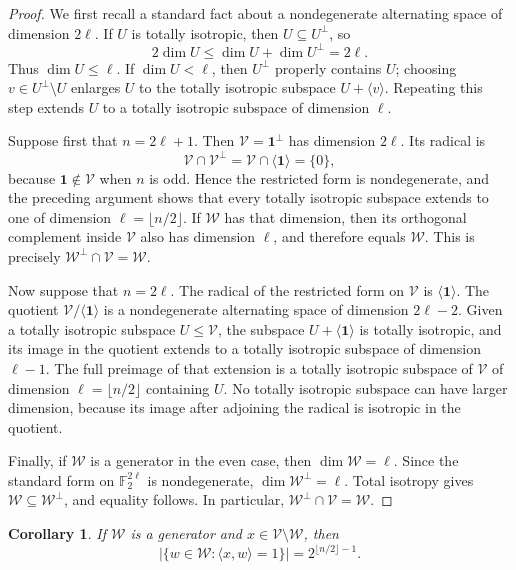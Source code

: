 \documentclass[11pt]{article}
\newtheorem{corollary}[theorem]{Corollary}
\newcommand{\one}{\mathbf 1}
\begin{document}
\begin{proof}
We first recall a standard fact about a nondegenerate alternating space of
dimension \(2\ell\).  If \(U\) is totally isotropic, then
\(U\subseteq U^\perp\), so
\[
 2\dim U\le \dim U+\dim U^\perp=2\ell.
\]
Thus \(\dim U\le\ell\).  If \(\dim U<\ell\), then
\(U^\perp\) properly contains \(U\); choosing
\(v\in U^\perp\setminus U\) enlarges \(U\) to the totally isotropic
subspace \(U+\langle v\rangle\).  Repeating this step extends \(U\) to a
totally isotropic subspace of dimension \(\ell\).

Suppose first that \(n=2\ell+1\).  Then \(\mathcal V=\one^\perp\) has
dimension \(2\ell\).  Its radical is
\[
 \mathcal V\cap\mathcal V^\perp
 =
 \mathcal V\cap\langle\one\rangle
 =\{0\},
\]
because \(\one\notin\mathcal V\) when \(n\) is odd.  Hence the restricted
form is nondegenerate, and the preceding argument shows that every totally
isotropic subspace extends to one of dimension
\(\ell=\lfloor n/2\rfloor\).  If \(\mathcal W\) has that dimension, then
its orthogonal complement inside \(\mathcal V\) also has dimension
\(\ell\), and therefore equals \(\mathcal W\).  This is precisely
\(\mathcal W^\perp\cap\mathcal V=\mathcal W\).

Now suppose that \(n=2\ell\).  The radical of the restricted form on
\(\mathcal V\) is \(\langle\one\rangle\).  The quotient \(\mathcal V/\langle\one\rangle\) is a nondegenerate alternating space of dimension \(2\ell-2\).  Given a totally isotropic subspace \(U\le\mathcal V\), the subspace
\(U+\langle\one\rangle\) is totally isotropic, and its image in the quotient extends to a totally isotropic subspace of dimension \(\ell-1\).  The full
preimage of that extension is a totally isotropic subspace of \(\mathcal V\) of dimension \(\ell=\lfloor n/2\rfloor\) containing
\(U\).  No totally isotropic subspace can have larger dimension, because its
image after adjoining the radical is isotropic in the quotient.

Finally, if \(\mathcal W\) is a generator in the even case, then
\(\dim\mathcal W=\ell\).  Since the standard form on
\(\mathbb F_2^{2\ell}\) is nondegenerate,
\(\dim\mathcal W^\perp=\ell\).  Total isotropy gives
\(\mathcal W\subseteq\mathcal W^\perp\), and equality follows.  In
particular, \(\mathcal W^\perp\cap\mathcal V=\mathcal W\).
\end{proof}

\begin{corollary}\label{cor:half-neighbors}
If \(\mathcal W\) is a generator and
\(x\in\mathcal V\setminus\mathcal W\), then
\[
 \bigl|\{w\in\mathcal W:\langle x,w\rangle=1\}\bigr|
 =2^{\lfloor n/2\rfloor-1}.
\]
\end{corollary}
\end{document}
